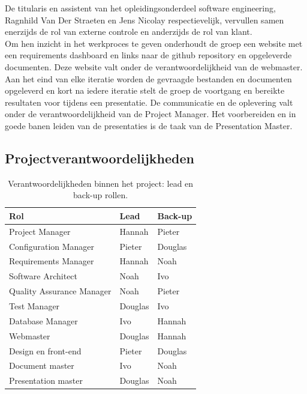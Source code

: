 \documentclass{article}
\begin{document}
De titularis en assistent van het opleidingsonderdeel software engineering, Ragnhild Van Der Straeten en Jens Nicolay respectievelijk, vervullen samen enerzijds de rol van externe controle en anderzijds de rol van klant. \\

\noindent Om hen inzicht in het werkproces te geven onderhoudt de groep een website met een requirements dashboard en links naar de github repository en opgeleverde documenten. Deze website valt onder de verantwoordelijkheid van de webmaster.  \\

\noindent Aan het eind van elke iteratie worden de gevraagde bestanden en documenten opgeleverd en kort na iedere iteratie stelt de groep de voortgang en bereikte resultaten voor tijdens een presentatie. De communicatie en de oplevering valt onder de verantwoordelijkheid van de Project Manager. Het voorbereiden en in goede banen leiden van de presentaties is de taak van de Presentation Master. 

 \clearpage

\subsection{Projectverantwoordelijkheden}

\begin{table}[!h] 
  \begin{center}
    \begin{tabular}{| l || l | l |} 
      \hline
       {\bf Rol } &  {\bf Lead} &  {\bf  Back-up}  \\
      \hline
      Project Manager & Hannah & Pieter  \\
      \hline
      Configuration Manager & Pieter &  Douglas \\
      \hline
      Requirements Manager & Hannah & Noah \\
      \hline
      Software Architect & Noah & Ivo  \\
      \hline
      Quality Assurance Manager & Noah &  Pieter \\
      \hline
      Test Manager & Douglas &  Ivo \\
      \hline
       Database Manager & Ivo & Hannah  \\
      \hline
       Webmaster & Douglas & Hannah \\
      \hline
     Design en front-end & Pieter & Douglas \\
      \hline
       Document master & Ivo & Noah   \\
      \hline
        Presentation master & Douglas & Noah \\
      \hline
    \end{tabular}
  \end{center}
  \caption{Verantwoordelijkheden binnen het project: lead en back-up rollen.}
  \label{rolverdeling}
 \end{table}
\end{document}
